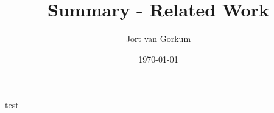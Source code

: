 \documentclass{report}
\title{
    {Summary - Related Work}
}
\author{Jort van Gorkum}
\date{\today}
\begin{document}
    test
\end{document}
